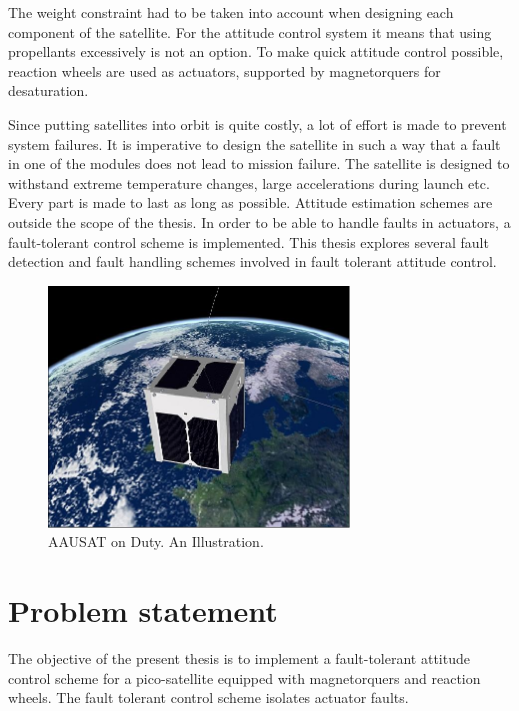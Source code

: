  The weight constraint had to be taken into account when designing each component of the satellite. For the attitude control system it means that using propellants excessively is not an option. To make quick attitude control possible, reaction wheels are used as actuators, supported by magnetorquers for desaturation. 
   
 Since putting satellites into orbit is quite costly, a lot of effort is made to prevent system failures. It is imperative to design the satellite in such a way that a fault in one of the modules does not lead to mission failure. The satellite is designed to withstand extreme temperature changes, large accelerations during launch etc. Every part is made to last as long as possible. Attitude estimation schemes are outside the scope of the thesis. In order to be able to handle faults in actuators, a fault-tolerant control scheme is implemented.  This thesis explores several fault detection and fault handling schemes involved in fault tolerant attitude control.
 
 
 
 \begin{figure}%
 	\centering 
 	\includegraphics[width=80mm]{figures/aausatInSpace.jpg}	
 	\caption{AAUSAT on Duty. An Illustration. \cite{imref}}
 	\label{fig:aauinspace}
 \end{figure}

 
 

\section{Problem statement}
The objective of the present thesis is to implement a fault-tolerant attitude control scheme for a pico-satellite equipped with magnetorquers and reaction wheels. The fault tolerant control scheme isolates actuator faults.

